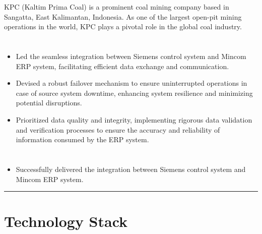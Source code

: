 \documentclass[12pt]{res}
\begin{document}
\begin{resume}
\begin{multicols}{2}
	\columnbreak
	{\footnotesize{KPC (Kaltim Prima Coal) is a prominent coal mining company based in Sangatta, East Kalimantan, Indonesia. As one of the largest open-pit mining operations in the world, KPC plays a pivotal role in the global coal industry.}}\\
\end{multicols}
\vspace{-20pt}

\begin{multicols}{2}
	\section{}
		\begin{itemize}
			\item Led the seamless integration between Siemens control system and Mincom ERP system, facilitating efficient data exchange and communication.
\item Devised a robust failover mechanism to ensure uninterrupted operations in case of source system downtime, enhancing system resilience and minimizing potential disruptions.
\item Prioritized data quality and integrity, implementing rigorous data validation and verification processes to ensure the accuracy and reliability of information consumed by the ERP system.
		\end{itemize}
	\section{}
		\begin{itemize}
			\setlength{\itemindent}{0pt}
			\item Successfully delivered the integration between Siemens control system and Mincom ERP system.
		\end{itemize}
\end{multicols}

\vspace{-20pt}
\begin{minipage}[t]{0.55\linewidth}
	\rule{0.25\textwidth}{2pt}
	\begin{multicols}{2}
		\section{Technology Stack}
		\columnbreak
		\section{}
	\end{multicols}
	\vspace{1pt}
\end{minipage}
\hfill
\begin{minipage}[t]{0.42\linewidth}
	\vspace{18pt}

\end{minipage}
\end{resume}
\end{document}

